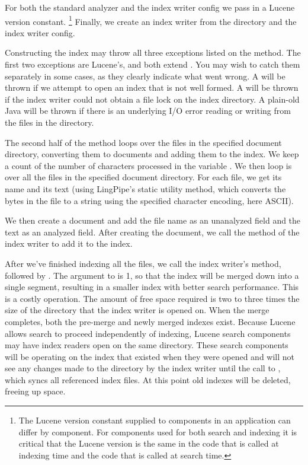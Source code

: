 For both the standard analyzer and the index writer
config we pass in a Lucene version constant.%
%
\footnote{The Lucene version constant supplied to components
in an application can differ by component.
For components used for both search and indexing it is critical
that the Lucene version is the same in the code that is called
at indexing time and the code that is called at search time.}
%
Finally, we create an index writer from the directory and the
index writer config.

Constructing the index may throw all three exceptions listed on the
 method.  The first two exceptions are Lucene's, and both
extend .  You may wish to catch them separately in
some cases, as they clearly indicate what went wrong. A
 will be thrown if we attempt to open an
index that is not well formed.  A 
will be thrown if the index writer could not obtain a file lock on the
index directory.  A plain-old Java  will be thrown
if there is an underlying I/O error reading or writing from the files
in the directory.

The second half of the  method loops over the files
in the specified document directory, converting them to documents
and adding them to the index.
%
%
We keep a count of the number of characters processed in the variable
.  We then loop is over all the files in the specified
document directory.  For each file, we get its name and its text
(using LingPipe's static  utility method, which
converts the bytes in the file to a string using the specified
character encoding, here ASCII).  

We then create a document and add the file name as an unanalyzed field
and the text as an analyzed field.  After creating the document, we
call the  method of the index writer to
add it to the index.

After we've finished indexing all the files, we call the index
writer's  method, followed by .
The argument to  is 1, so that the index will be merged down
into a single segment, 
resulting in a smaller index with better search performance.  
This is a costly operation.
The amount of free space required is two to three times the size of
the directory that the index writer is opened on.
When the merge completes, both the pre-merge and newly merged indexes exist.
Because Lucene allows search to proceed independently of indexing,
Lucene search components may have index readers open on the same directory.
These search components will be operating on the index that existed when they were opened
and will not see any changes made to the directory by the index writer
until the call to , which syncs all referenced index files.
At this point old indexes will be deleted, freeing up space.

